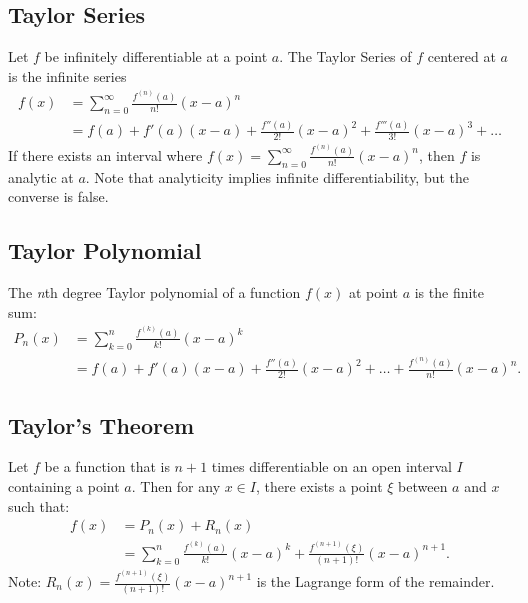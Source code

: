 \documentclass[a4paper,11pt]{article}
\begin{document}


\subsection{Taylor Series}

\begin{tcolorbox}
    Let $f$ be infinitely differentiable at a point $a$. The Taylor Series of $f$ centered at $a$ is the infinite series
    \begin{align*}
        f(x) &= \sum_{n=0}^{\infty} \frac{f^{(n)}(a)}{n!} (x-a)^n \\
        &= f(a) + f'(a) (x-a) + \frac{f''(a)}{2!} (x-a)^2 + \frac{f'''(a)}{3!} (x-a)^3 + \dots
    \end{align*}
    If there exists an interval where $\textstyle f(x) = \sum_{n=0}^{\infty} \frac{f^{(n)}(a)}{n!} (x-a)^n$, then $f$ is analytic at $a$. Note that analyticity implies infinite differentiability, but the converse is false.
\end{tcolorbox}




\subsection{Taylor Polynomial}

\begin{tcolorbox}
    The \emph{n}th degree Taylor polynomial of a function $f(x)$ at point $a$ is the finite sum:
    \begin{align*}
        P_n(x) &= \sum_{k=0}^n \frac{f^{(k)}(a)}{k!} (x-a)^k \\
        &= f(a) + f'(a) (x-a) + \frac{f''(a)}{2!} (x-a)^2 + \dots + \frac{f^{(n)}(a)}{n!} (x-a)^n.
    \end{align*}
\end{tcolorbox}




\subsection{Taylor's Theorem}

\begin{tcolorbox}
    Let $f$ be a function that is $n+1$ times differentiable on an open interval $I$ containing a point $a$. Then for any $x \in I$, there exists a point $\xi$ between $a$ and $x$ such that:
    \begin{align*}
        f(x) &= P_n(x) + R_n(x) \\
        &= \sum_{k=0}^n \frac{f^{(k)}(a)}{k!} (x-a)^k + \frac{f^{(n+1)}(\xi)}{(n+1)!} (x - a)^{n+1}.
    \end{align*}
    Note: $\textstyle R_n(x) =  \frac{f^{(n+1)}(\xi)}{(n+1)!} (x - a)^{n+1}$ is the Lagrange form of the remainder.
\end{tcolorbox}
\end{document}
